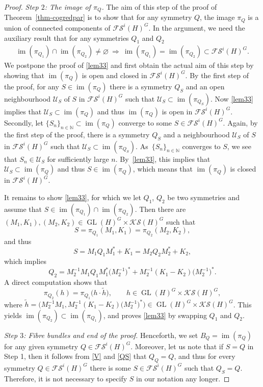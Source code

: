 \documentclass[10pt,a4paper]{amsart}
\DeclareMathOperator{\GL}{GL}
\DeclareMathOperator{\im}{im}
\begin{document}
\begin{proof}
{\it Step $2$: The image of $\pi_Q$.}
The aim of this step of the proof of Theorem~\ref{thm-cogredpar} is to show that for any symmetry $Q$, the image $\pi_Q$ is a union of connected components of $\mathcal{FS}^i(H)^G$. In the argument, we need the auxiliary result that for any symmetries $Q_1$ and $Q_2$
\begin{align}\label{lem33}
\im(\pi_{Q_1})\cap \im(\pi_{Q_2})\neq\varnothing \ \Longrightarrow \ \im(\pi_{Q_1})=\im(\pi_{Q_2})\subset\mathcal{FS}^i(H)^G.
\end{align}
We postpone the proof of \eqref{lem33} and first obtain the actual aim of this step by showing that $\im(\pi_Q)$ is open and closed in $\mathcal{FS}^i(H)^G$. By the first step of the proof, for any $S\in\im(\pi_Q)$ there is a symmetry $Q_S$ and an open neighbourhood $\mathcal{U}_S$ of $S$ in $\mathcal{FS}^i(H)^G$ such that $\mathcal{U}_S\subset\im(\pi_{Q_S})$. Now \eqref{lem33} implies that $\mathcal{U}_S\subset\im(\pi_Q)$ and thus $\im(\pi_Q)$ is open in $\mathcal{FS}^i(H)^G$. Secondly, let $\{S_n\}_{n\in\mathbb{N}}\subset\im(\pi_Q)$ converge to some $S\in\mathcal{FS}^i(H)^G$. Again, by the first step of the proof, there is a symmetry $Q_S$ and a neighbourhood $\mathcal{U}_S$ of $S$ in $\mathcal{FS}^i(H)^G$ such that $\mathcal{U}_S\subset\im(\pi_{Q_S})$. As~$\{S_n\}_{n\in\mathbb{N}}$ converges to $S$, we see that $S_n\in\mathcal{U}_S$ for sufficiently large $n$. By~\eqref{lem33}, this implies that $\mathcal{U}_S\subset\im(\pi_Q)$ and thus $S\in\im(\pi_Q)$, which means that $\im(\pi_Q)$ is closed in $\mathcal{FS}^i(H)^G$.

It remains to show \eqref{lem33}, for which we let $Q_1$, $Q_2$ be two symmetries and assume that $S\in \im(\pi_{Q_1})\cap \im(\pi_{Q_2})$. Then there are $(M_1,K_1), (M_2,K_2)\in\GL(H)^G\times\mathcal{KS}(H)^G$ such that
\[S=\pi_{Q_1}(M_1,K_1)=\pi_{Q_2}(M_2,K_2),\]
and thus
\[S=M_1Q_1M^\ast_1+K_1=M_2Q_2M^\ast_2+K_2,\]
which implies
\[Q_2=M^{-1}_2M_1Q_1M^\ast_1\bigl(M^{-1}_2\bigr)^\ast+M^{-1}_2(K_1-K_2)\bigl(M^{-1}_2\bigr)^\ast.\]
A direct computation shows that
\[\pi_{Q_2}(h)=\pi_{Q_1}\bigl(h\cdot \tilde{h}\bigr),\qquad h\in \GL(H)^G\times\mathcal{KS}(H)^G,\]
where $\tilde{h}=\bigl(M^{-1}_2M_1,M^{-1}_2(K_1-K_2)\bigl(M^{-1}_2\bigr)^\ast\bigr)\in \GL(H)^G\times\mathcal{KS}(H)^G$. This yields $\im(\pi_{Q_2})\subset\im(\pi_{Q_1})$, and proves \eqref{lem33} by swapping $Q_1$ and $Q_2$.

{\it Step $3$: Fibre bundles and end of the proof.}
Henceforth, we set $B_Q=\im(\pi_Q)$ for any given symmetry $Q\in\mathcal{FS}^i(H)^G$. Moreover, let us note that if $S=Q$ in Step 1, then it follows from \eqref{V} and \eqref{QS} that $Q_Q=Q$, and thus for every symmetry $Q\in\mathcal{FS}^i(H)^G$ there is some $S\in\mathcal{FS}^i(H)^G$ such that $Q_S=Q$. Therefore, it is not necessary to specify $S$ in our notation any longer.


\end{proof}
\end{document}

